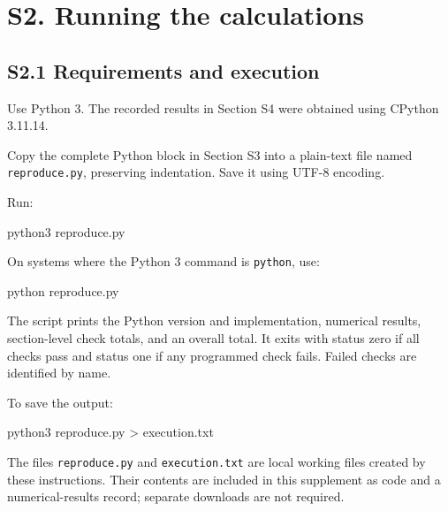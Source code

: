 \documentclass[
]{article}
\newenvironment{Shaded}{}{}
\newcommand{\ExtensionTok}[1]{#1}
\newcommand{\NormalTok}[1]{#1}
\newcommand{\OperatorTok}[1]{\textcolor[rgb]{0.40,0.40,0.40}{#1}}
\begin{document}
\section{S2. Running the
calculations}\label{s2.-running-the-calculations}

\subsection{S2.1 Requirements and
execution}\label{s2.1-requirements-and-execution}

Use Python 3. The recorded results in Section S4 were obtained using
CPython 3.11.14.

Copy the complete Python block in Section S3 into a plain-text file
named \texttt{reproduce.py}, preserving indentation. Save it using UTF-8
encoding.

Run:

\begin{Shaded}
\begin{Highlighting}[]
\ExtensionTok{python3}\NormalTok{ reproduce.py}
\end{Highlighting}
\end{Shaded}

On systems where the Python 3 command is \texttt{python}, use:

\begin{Shaded}
\begin{Highlighting}[]
\ExtensionTok{python}\NormalTok{ reproduce.py}
\end{Highlighting}
\end{Shaded}

The script prints the Python version and implementation, numerical
results, section-level check totals, and an overall total. It exits with
status zero if all checks pass and status one if any programmed check
fails. Failed checks are identified by name.

To save the output:

\begin{Shaded}
\begin{Highlighting}[]
\ExtensionTok{python3}\NormalTok{ reproduce.py }\OperatorTok{\textgreater{}}\NormalTok{ execution.txt}
\end{Highlighting}
\end{Shaded}

The files \texttt{reproduce.py} and \texttt{execution.txt} are local
working files created by these instructions. Their contents are included
in this supplement as code and a numerical-results record; separate
downloads are not required.
\end{document}
